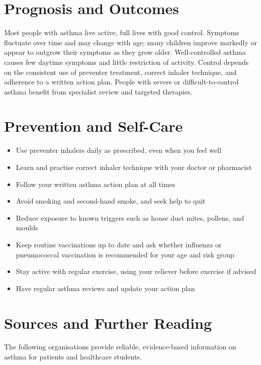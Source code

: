 \section*{Prognosis and Outcomes}
Most people with asthma live active, full lives with good control. Symptoms fluctuate over time and may change with age; many children improve markedly or appear to outgrow their symptoms as they grow older. Well-controlled asthma causes few daytime symptoms and little restriction of activity. Control depends on the consistent use of preventer treatment, correct inhaler technique, and adherence to a written action plan. People with severe or difficult-to-control asthma benefit from specialist review and targeted therapies.

\section*{Prevention and Self-Care}
\begin{itemize}
    \item Use preventer inhalers daily as prescribed, even when you feel well
    \item Learn and practise correct inhaler technique with your doctor or pharmacist
    \item Follow your written asthma action plan at all times
    \item Avoid smoking and second-hand smoke, and seek help to quit
    \item Reduce exposure to known triggers such as house dust mites, pollens, and moulds
    \item Keep routine vaccinations up to date and ask whether influenza or pneumococcal vaccination is recommended for your age and risk group
    \item Stay active with regular exercise, using your reliever before exercise if advised
    \item Have regular asthma reviews and update your action plan
\end{itemize}

\section*{Sources and Further Reading}
The following organisations provide reliable, evidence-based information on asthma for patients and healthcare students.

